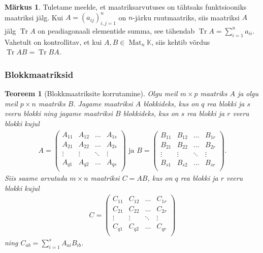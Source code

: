 \documentclass[12pt,a4paper,oneside]{article}
\theoremstyle{plain}
\newtheorem{teoreem}{Teoreem}[section]
\theoremstyle{definition}
\newtheorem{markus}{Märkus}[section]
\numberwithin{equation}{section}
\def\K{{\mathbb K}}
\DeclareMathOperator{\Mat}{Mat}
\DeclareMathOperator{\Tr}{Tr}
\begin{document}
\begin{markus} \label{markus:trace}
Tuletame meelde, et maatriksarvutuses on tähtsaks funktsiooniks  
maatriksi jälg. Kui $A=(a_{ij})_{i,j = 1}^{n}$ on $n$-järku 
ruutmaatriks, siis maatriksi $A$ jälg $\Tr A$ on peadiagonaali 
elementide summa, see tähendab $\Tr A=\sum_{i = 1}^{n} a_{ii}$. 
Vahetult on kontrollitav, et kui $A,B \in \Mat_n \K$, siis kehtib 
võrdus $\Tr AB= \Tr BA$.
\end{markus}

\subsubsection*{Blokkmaatriksid}

\begin{teoreem}[Blokkmaatriksite korrutamine]
Olgu meil $m \times p$ maatriks $A$ ja olgu meil $p \times n$ maatriks 
$B$. Jagame maatriksi $A$ blokkideks, kus on $q$ rea blokki ja $s$ 
veeru blokki ning jagame maatriksi $B$ blokkideks, kus on $s$ rea 
blokki ja $r$ veeru blokki kujul
\begin{align*}
A = \begin{pmatrix}
A_{11} & A_{12} & \dots & A_{1s} \\
A_{21} & A_{22} & \dots & A_{2s} \\
\vdots & \vdots & \ddots & \vdots \\
A_{q1} & A_{q2} & \dots & A_{qs} \\
\end{pmatrix} \text{ ja }
B = \begin{pmatrix}
B_{11} & B_{12} & \dots & B_{1r} \\
B_{21} & B_{22} & \dots & B_{2r} \\
\vdots & \vdots & \ddots & \vdots \\
B_{s1} & B_{s2} & \dots & B_{sr} \\
\end{pmatrix}.
\end{align*}
Siis saame arvutada $m \times n$ maatriksi $C = AB$, kus on $q$ rea 
blokki ja $r$ veeru blokki kujul
\begin{align*}
C = \begin{pmatrix}
C_{11} & C_{12} & \dots & C_{1r} \\
C_{21} & C_{22} & \dots & C_{2r} \\
\vdots & \vdots & \ddots & \vdots \\
C_{q1} & C_{q2} & \dots & C_{qr} \\
\end{pmatrix}
\end{align*}
ning $C_{ab} = \sum_{i = 1}^{s} A_{ai} B_{ib}$.
\end{teoreem}
\end{document}
